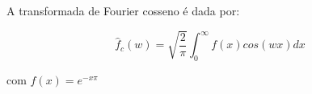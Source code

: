 \linespread{1.5}

A transformada de Fourier cosseno é dada por:

\begin{equation*}
    \hat{f}_c(w) = \sqrt{\frac{2}{\pi}}\int_0^\infty f(x)cos(wx)dx
\end{equation*}

com $f(x) = e^{-x\pi}$ 